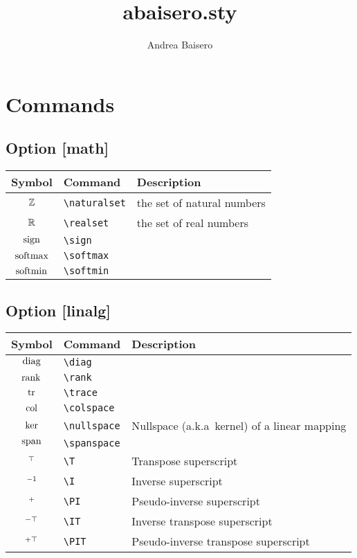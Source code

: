 \documentclass{article}
\begin{document}
\title{abaisero.sty}
\author{Andrea Baisero}

\newcommand\command[1]{\texttt{\textbackslash{#1}}}

\maketitle

\section{Commands}

\subsection*{Option [math]}

\begin{tabular}{cll}
  \toprule
  Symbol & Command & Description \\
  \midrule
  $\mathbb{Z}$ & \command{naturalset} & the set of natural numbers \\
  $\mathbb{R}$ & \command{realset} & the set of real numbers \\
  $\operatorname*{sign}$ & \command{sign} & \\
  $\operatorname*{softmax}$ & \command{softmax} & \\
  $\operatorname*{softmin}$ & \command{softmin} & \\
  \bottomrule
\end{tabular}

\subsection*{Option [linalg]}

\begin{tabular}{cll}
  \toprule
  Symbol & Command & Description \\
  \midrule
  $\operatorname*{diag}$ & \command{diag} & \\
  $\operatorname*{rank}$ & \command{rank} & \\
  $\operatorname*{tr}$ & \command{trace} & \\
  $\operatorname*{col}$ & \command{colspace} & \\
  $\operatorname*{ker}$ & \command{nullspace} & Nullspace (a.k.a\ kernel) of a linear mapping \\
  $\operatorname*{span}$ & \command{spanspace} & \\
  $^\top$ & \command{T} & Transpose superscript \\
  $^{-1}$ & \command{I} & Inverse superscript \\
  $^{+}$ & \command{PI} & Pseudo-inverse superscript \\
  $^{-\top}$ & \command{IT} & Inverse transpose superscript \\
  $^{+\top}$ & \command{PIT} & Pseudo-inverse transpose superscript \\
  \bottomrule
\end{tabular}
\end{document}
